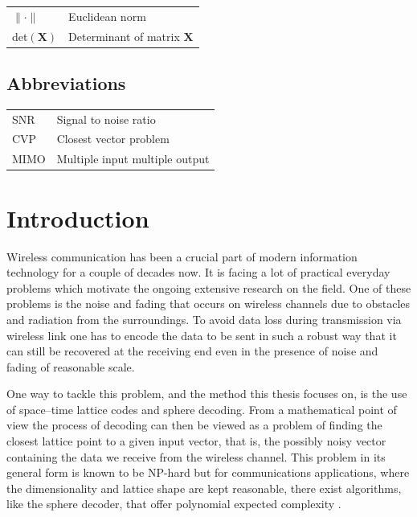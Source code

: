 \documentclass[english,12pt,a4paper,pdftex,sci,utf8]{aaltothesis}
\begin{document}
\begin{tabular}{ll}
$\| \cdot \| $     & Euclidean norm \\
det$(\mathbf{X})$  & Determinant of matrix $\mathbf{X}$
\end{tabular}

\subsection*{Abbreviations}

\begin{tabular}{ll}
SNR & Signal to noise ratio \\
CVP & Closest vector problem \\
MIMO & Multiple input multiple output
\end{tabular}


\cleardoublepage
\storeinipagenumber
{}
\setcounter{page}{1}


\section{Introduction}
Wireless communication has been a crucial part of modern information technology for a couple of decades now. It is facing a lot of practical everyday problems which motivate the ongoing extensive research on the field. One of these problems is the noise and fading that occurs on wireless channels due to obstacles and radiation from the surroundings. To avoid data loss during transmission via wireless link one has to encode the data to be sent in such a robust way that it can still be recovered at the receiving end even in the presence of noise and fading of reasonable scale. 
\par One way to tackle this problem, and the method this thesis focuses on, is the use of space--time lattice codes and sphere decoding. From a mathematical point of view the process of decoding can then be viewed as a problem of finding the closest lattice point to a given input vector, that is, the possibly noisy vector containing the data we receive from the wireless channel. This problem in its general form is known to be NP-hard but for communications applications, where the dimensionality and lattice shape are kept reasonable, there exist algorithms, like the sphere decoder, that offer polynomial expected complexity \cite{mia}.
\end{document}
